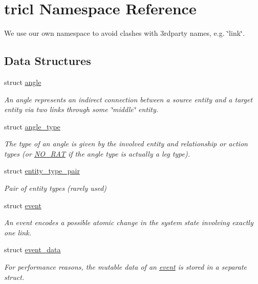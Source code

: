 \hypertarget{namespacetricl}{}\section{tricl Namespace Reference}
\label{namespacetricl}


We use our own namespace to avoid clashes with 3rdparty names, e.\+g. \char`\"{}link\char`\"{}.  


\subsection*{Data Structures}
\begin{DoxyCompactItemize}
\item 
struct \hyperlink{structtricl_1_1angle}{angle}
\begin{DoxyCompactList}\small\item\em An angle represents an indirect connection between a source entity and a target entity via two links through some \char`\"{}middle\char`\"{} entity. \end{DoxyCompactList}\item 
struct \hyperlink{structtricl_1_1angle__type}{angle\+\_\+type}
\begin{DoxyCompactList}\small\item\em The type of an angle is given by the involved entity and relationship or action types (or \hyperlink{data__model_8h_ae71ff63a5bdb6bfc09a18840c8df4e54}{N\+O\+\_\+\+R\+AT} if the angle type is actually a leg type). \end{DoxyCompactList}\item 
struct \hyperlink{structtricl_1_1entity__type__pair}{entity\+\_\+type\+\_\+pair}
\begin{DoxyCompactList}\small\item\em Pair of entity types (rarely used) \end{DoxyCompactList}\item 
struct \hyperlink{structtricl_1_1event}{event}
\begin{DoxyCompactList}\small\item\em An event encodes a possible atomic change in the system state involving exactly one link. \end{DoxyCompactList}\item 
struct \hyperlink{structtricl_1_1event__data}{event\+\_\+data}
\begin{DoxyCompactList}\small\item\em For performance reasons, the mutable data of an \hyperlink{structtricl_1_1event}{event} is stored in a separate struct. \end{DoxyCompactList}\item 

\end{DoxyCompactItemize}
